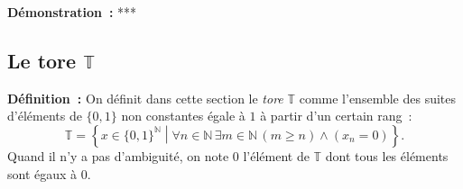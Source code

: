\medskip

\noindent\textbf{Démonstration :} ***

\subsection{Le tore \texorpdfstring{$\mathbb{T}$}{T}}

\noindent\textbf{Définition :} On définit dans cette section le \emph{tore} $\mathbb{T}$ comme l'ensemble des suites d'éléments de $\lbrace 0, 1 \rbrace$ non constantes égale à $1$ à partir d'un certain rang : 
\begin{equation*}
    \mathbb{T} = \left\lbrace
        x \in \lbrace 0, 1 \rbrace^{\mathbb{N}} 
        \middle\vert
        \forall n \in \mathbb{N} \, \exists m \in \mathbb{N} \, (m \geq n) \wedge (x_n = 0)
    \right\rbrace .
\end{equation*}
Quand il n'y a pas d'ambiguité, on note $0$ l'élément de $\mathbb{T}$ dont tous les éléments sont égaux à $0$.

